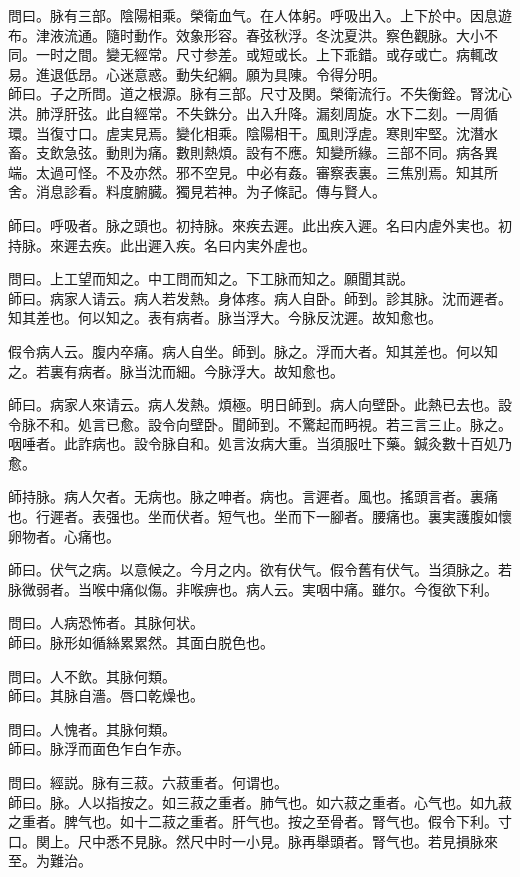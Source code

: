 問曰。脉有三部。陰陽相乘。榮衛血气。在人体躬。呼吸出入。上下於中。因息遊布。津液流通。隨时動作。效象形容。春弦秋浮。冬沈夏洪。察色觀脉。大小不同。一时之間。變无經常。尺寸参差。或短或长。上下乖錯。或存或亡。病輒改易。進退低昂。心迷意惑。動失纪綱。願为具陳。令得分明。\\
師曰。子之所問。道之根源。脉有三部。尺寸及関。榮衛流行。不失衡銓。腎沈心洪。肺浮肝弦。此自經常。不失銖分。出入升降。漏刻周旋。水下二刻。一周循環。当復寸口。虗実見焉。變化相乘。陰陽相干。風則浮虗。寒則牢堅。沈潛水畜。支飲急弦。動則为痛。數則熱煩。設有不應。知變所緣。三部不同。病各異端。太過可怪。不及亦然。邪不空見。中必有姦。審察表裏。三焦別焉。知其所舍。消息診看。料度腑臓。獨見若神。为子條記。傳与賢人。

師曰。呼吸者。脉之頭也。初持脉。來疾去遲。此出疾入遲。名曰内虗外実也。初持脉。來遲去疾。此出遲入疾。名曰内実外虗也。

問曰。上工望而知之。中工問而知之。下工脉而知之。願聞其説。\\
師曰。病家人请云。病人若发熱。身体疼。病人自卧。師到。診其脉。沈而遲者。知其差也。何以知之。表有病者。脉当浮大。今脉反沈遲。故知愈也。

假令病人云。腹内卒痛。病人自坐。師到。脉之。浮而大者。知其差也。何以知之。若裏有病者。脉当沈而細。今脉浮大。故知愈也。

師曰。病家人來请云。病人发熱。煩極。明日師到。病人向壁卧。此熱已去也。設令脉不和。処言已愈。設令向壁卧。聞師到。不驚起而眄視。若三言三止。脉之。咽唾者。此詐病也。設令脉自和。処言汝病大重。当須服吐下藥。鍼灸數十百処乃愈。

師持脉。病人欠者。无病也。脉之呻者。病也。言遲者。風也。搖頭言者。裏痛也。行遲者。表强也。坐而伏者。短气也。坐而下一腳者。腰痛也。裏実護腹如懷卵物者。心痛也。

師曰。伏气之病。以意候之。今月之内。欲有伏气。假令舊有伏气。当須脉之。若脉微弱者。当喉中痛似傷。非喉痹也。病人云。実咽中痛。雖尔。今復欲下利。

問曰。人病恐怖者。其脉何状。\\
師曰。脉形如循絲累累然。其面白脱色也。

問曰。人不飲。其脉何類。\\
師曰。其脉自濇。唇口乾燥也。

問曰。人愧者。其脉何類。\\
師曰。脉浮而面色乍白乍赤。

問曰。經説。脉有三菽。六菽重者。何谓也。\\
師曰。脉。人以指按之。如三菽之重者。肺气也。如六菽之重者。心气也。如九菽之重者。脾气也。如十二菽之重者。肝气也。按之至骨者。腎气也。假令下利。寸口。関上。尺中悉不見脉。然尺中时一小見。脉再舉頭者。腎气也。若見損脉來至。为難治。

